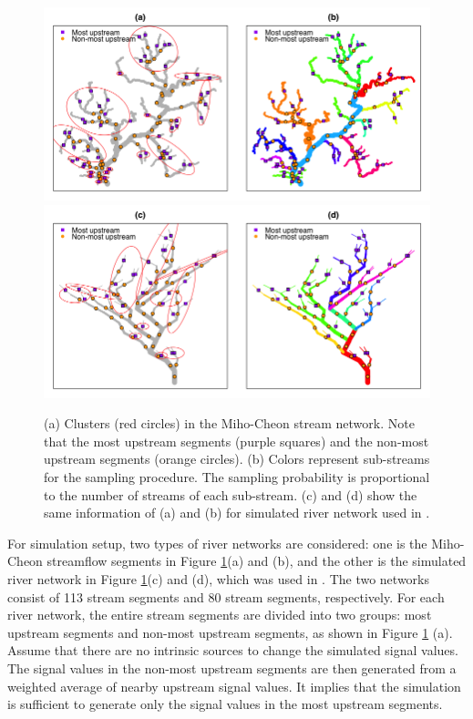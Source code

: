 \documentclass[11pt,titlepage]{article}
\begin{document}
\begin{figure}
	\centering\includegraphics[width=1\textwidth]{Stream_result/Stream_cluster_maps_new(5).png}
	\centering\includegraphics[width=1\textwidth]{Stream_result/Stream_cluster_maps_STPCA(2).png}
	\vspace{-10mm}\caption{(a) Clusters (red circles) in the Miho-Cheon stream network. Note that the most upstream segments (purple squares) and the non-most upstream segments (orange circles). (b) Colors represent sub-streams for the sampling procedure. The sampling probability is proportional to the number of streams of each sub-stream. {\color{red} (c) and (d) show the same information of (a) and (b) for simulated river network used in \cite{Gallacher2017}.}} 
	\label{fig:clusterconstruction}
\end{figure}

For simulation setup, two types of river networks are considered: one is the Miho-Cheon streamflow segments in Figure \ref{fig:clusterconstruction}(a) and (b), and the other is the simulated river network in Figure \ref{fig:clusterconstruction}(c) and (d), which was used in \cite{Gallacher2017}. The two networks consist of 113 stream segments and 80 stream segments, respectively. For each river network, the entire stream segments are divided into two groups: most upstream segments and non-most upstream segments, as shown in Figure \ref{fig:clusterconstruction} (a). Assume that there are no intrinsic sources to change the simulated signal values. The signal values in the non-most upstream segments are then generated from a weighted average of nearby upstream signal values. It implies that the simulation is sufficient to generate only the signal values in the most upstream segments. 
\end{document}
